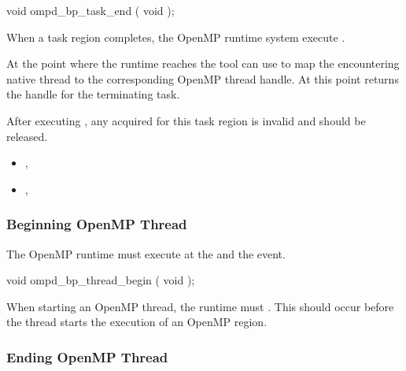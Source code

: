 \format
\begin{cspecific}
\begin{ompSyntax}
void ompd_bp_task_end ( void );
\end{ompSyntax}
\end{cspecific}


\descr

When a task region completes, the OpenMP runtime system
execute .

At the point where the runtime reaches 
the tool can use
to map the encountering native thread to the corresponding
OpenMP thread handle.
At this point 
returns the handle for the terminating task.

After 
executing , any  acquired for this
task region is invalid and should be released.


\crossreferences
\begin{itemize}
\item
  , 
\item
  , 
\end{itemize}

\subsubsection{Beginning OpenMP Thread}
\label{subsubsec:ompd_bp_thread_begin}

\summary
The OpenMP runtime must execute 
 at the  and the  event.


\format
\begin{cspecific}
\begin{ompSyntax}
void ompd_bp_thread_begin ( void );
\end{ompSyntax}
\end{cspecific}


\descr

When starting an OpenMP thread, the runtime must 
.
This should occur before the thread starts the execution of an
OpenMP region.

\subsubsection{Ending OpenMP Thread}
\label{subsubsec:ompd_bp_thread_begin}

